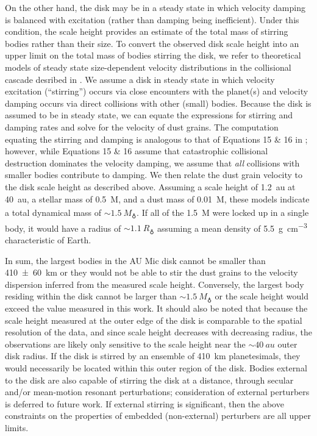 \documentclass[modern]{aastex62}
\begin{document}
On the other hand, the disk may be in a steady state in which velocity damping is balanced with excitation (rather than damping being inefficient).
Under this condition, the scale height provides an estimate of the total mass of stirring bodies rather than their size.
To convert the observed disk scale height into an upper limit on the total mass of bodies stirring the disk, we refer to theoretical models of steady state size-dependent velocity distributions in the collisional cascade desribed in \citet{pan&schlichting12}.
We assume a disk in steady state in which velocity excitation (``stirring'') occurs via close encounters with the planet(s) and velocity damping occurs via direct collisions with other (small) bodies. 
Because the disk is assumed to be in steady state, we can equate the expressions for stirring and damping rates and solve for the velocity of dust grains. 
The computation equating the stirring and damping is analogous to that of Equations 15 \& 16 in \citet{pan&schlichting12}; however, while Equations 15 \& 16 assume that catastrophic collisional destruction dominates the velocity damping, we assume that \textit{all} collisions with smaller bodies contribute to damping.
We then relate the dust grain velocity to the disk scale height as described above.
Assuming a scale height of \SI{1.2}{au} at \SI{40}{au}, a stellar mass of \SI{0.5}{M_\sun}, and a dust mass of \SI{0.01}{M_\earth}, these models indicate a total dynamical mass of $\sim\SI{1.5}{M_\earth}$.
If all of the \SI{1.5}{M_\earth} were locked up in a single body, it would have a radius of $\sim \SI{1.1}{R_\earth}$ assuming a mean density of \SI{5.5}{\g.\cm^{-3}} characteristic of Earth.

In sum, the largest bodies in the AU Mic disk cannot be smaller than \SI{410 \pm 60}{km} or they would not be able to stir the dust grains to the velocity dispersion inferred from the measured scale height.
Conversely, the largest body residing within the disk cannot be larger than $\sim \SI{1.5}{M_\earth}$ or the scale height would exceed the value measured in this work.
It should also be noted that because the scale height measured at the outer edge of the disk is comparable to the spatial resolution of the data, and since scale height decreases with decreasing radius, the observations are likely only sensitive to the scale height near the $\sim \SI{40}{au}$ outer disk radius. 
If the disk is stirred by an ensemble of \SI{410}{km} planetesimals, they would necessarily be located within this outer region of the disk. 
Bodies external to the disk are also capable of stirring the disk at a distance, 
through secular and/or mean-motion resonant perturbations;
consideration of external perturbers is deferred to future work.
If external stirring is significant, then the above constraints on the properties
of embedded (non-external) perturbers are all upper limits.
\end{document}
